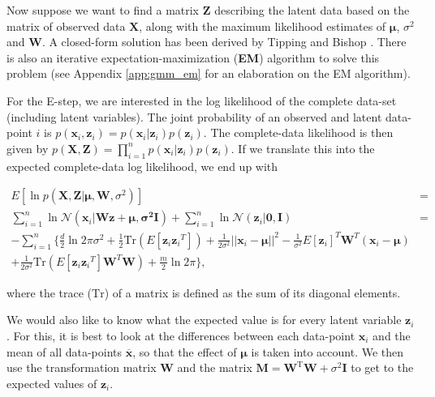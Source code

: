  Now suppose we want to find a matrix $\bm{Z}$ describing the latent data based on the matrix of observed data $\bm{X}$, along with the maximum likelihood estimates of $\bm{\mu}$, $\sigma^2$ and $\bm{W}$. A closed-form solution has been derived by Tipping and Bishop \cite{ppca}. There is also an iterative expectation-maximization (\textbf{EM}) algorithm to solve this problem (see Appendix \ref{app:gmm_em} for an elaboration on the EM algorithm). %
 
For the E-step, we are interested in the log likelihood of the complete data-set (including latent variables). The joint probability of an observed and latent data-point $i$ is $p(\bm{x}_i,\bm{z}_i) = p(\bm{x}_i | \bm{z}_i)p(\bm{z}_i)$. The complete-data likelihood is then given by $p(\bm{X},\bm{Z}) = \prod_{i=1}^{n} p(\bm{x}_i | \bm{z}_i)p(\bm{z}_i)$. If we translate this into the expected complete-data log likelihood, we end up with

\begin{equation}\label{eq:latentlog}
\begin{split}
    E[\ln p(\bm{X},\bm{Z}|\bm{\mu}, \bm{W}, \sigma^2)] &=\\
    \sum_{i=1}^n \ln{\mathcal{N}(\bm{x}_i|\bm{W}\bm{z}+\bm{\mu}, \bm{\sigma^2}\bm{I})} + \sum_{i=1}^n \ln{\mathcal{N}(\bm{z}_i|\bm{0}, \bm{I})}&=\\
    -\sum_{i=1}^{n}\Big\{ \frac{d}{2} \ln{2\pi \sigma^2} + \frac{1}{2} \text{Tr}(E[{\bm{z}_i}{\bm{z}_i}^T]) 
    + \frac{1}{2\sigma^2}||\bm{x}_i -\bm{\mu}||^2
    - \frac{1}{\sigma^2}E[\bm{z}_i]^T\bm{W}^T (\bm{x}_i-\bm{\mu})&\\
    + \frac{1}{2\sigma^2}\text{Tr}(E[\bm{z}_i{\bm{z}_i}^T]\bm{W}^T\bm{W})
    + \frac{m}{2}\ln{2\pi}\Big\},
\end{split}
\end{equation}

where the trace ($\text{Tr}$) of a matrix is defined as the sum of its diagonal elements.
 
 We would also like to know what the expected value is for every latent variable $\bm{z}_i$. For this, it is best to look at the differences between each data-point $\bm{x}_i$ and the mean of all data-points $\overline{\bm{x}}$, so that the effect of $\bm{\mu}$ is taken into account. We then use the transformation matrix $\bm{W}$ and the matrix $\bm{M} = \bm{W}^\text{T}\bm{W} + \sigma^2 \bm{I}$ to get to the expected values of $\bm{z}_i$.
 
